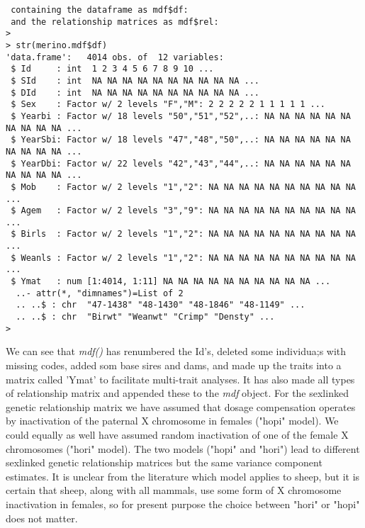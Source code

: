 \documentclass[titlepage]{article}  %
\begin{document}
\begin{verbatim}
 containing the dataframe as mdf$df:
 and the relationship matrices as mdf$rel:
> 
> str(merino.mdf$df)
'data.frame':	4014 obs. of  12 variables:
 $ Id     : int  1 2 3 4 5 6 7 8 9 10 ...
 $ SId    : int  NA NA NA NA NA NA NA NA NA NA ...
 $ DId    : int  NA NA NA NA NA NA NA NA NA NA ...
 $ Sex    : Factor w/ 2 levels "F","M": 2 2 2 2 2 1 1 1 1 1 ...
 $ Yearbi : Factor w/ 18 levels "50","51","52",..: NA NA NA NA NA NA NA NA NA NA ...
 $ YearSbi: Factor w/ 18 levels "47","48","50",..: NA NA NA NA NA NA NA NA NA NA ...
 $ YearDbi: Factor w/ 22 levels "42","43","44",..: NA NA NA NA NA NA NA NA NA NA ...
 $ Mob    : Factor w/ 2 levels "1","2": NA NA NA NA NA NA NA NA NA NA ...
 $ Agem   : Factor w/ 2 levels "3","9": NA NA NA NA NA NA NA NA NA NA ...
 $ Birls  : Factor w/ 2 levels "1","2": NA NA NA NA NA NA NA NA NA NA ...
 $ Weanls : Factor w/ 2 levels "1","2": NA NA NA NA NA NA NA NA NA NA ...
 $ Ymat   : num [1:4014, 1:11] NA NA NA NA NA NA NA NA NA NA ...
  ..- attr(*, "dimnames")=List of 2
  .. ..$ : chr  "47-1438" "48-1430" "48-1846" "48-1149" ...
  .. ..$ : chr  "Birwt" "Weanwt" "Crimp" "Densty" ...
> 
\end{verbatim}
We can see that {\em mdf()} has renumbered the Id's, deleted some individua;s with missing codes, added som base sires and dams, and made up the traits into a matrix called 'Ymat' to facilitate multi-trait analyses. It has also made all types of relationship matrix and appended these to the {\em mdf} object. For the sexlinked genetic relationship matrix we have assumed that dosage compensation operates by inactivation of the paternal X chromosome in females ("hopi" model).  We could equally as well have assumed random inactivation of one of the female X chromosomes ("hori" model). The two models ("hopi" and "hori") lead to different sexlinked genetic relationship matrices but the same variance component estimates.  It is unclear from the literature which model applies to sheep, but it is certain that sheep, along with all mammals, use some form of X chromosome inactivation in females, so for present purpose the choice between "hori" or "hopi" does not matter.
\end{document}
